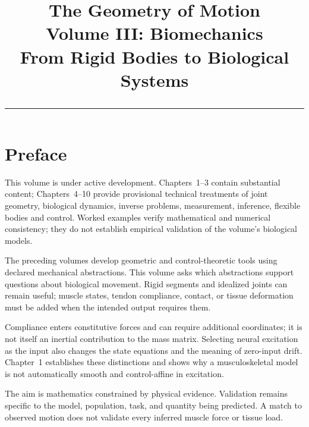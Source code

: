 \documentclass[10pt,letterpaper,openany]{book}
\title{%
  {\Huge\bfseries\color{chapblue} The Geometry of Motion}\\[0.4cm]
  {\Large Volume III: Biomechanics\\
  From Rigid Bodies to Biological Systems}\\[0.6cm]
  {\color{chapblue}\rule{\textwidth}{2pt}}
}
\date{}
\theoremstyle{plain}
\begin{document}
\maketitle
\thispagestyle{empty}
\cleardoublepage

\frontmatter
\chapter*{Preface}

\begin{gomdraftnotice}
This volume is under active development. Chapters~1--3 contain substantial
content; Chapters~4--10 provide provisional technical treatments of joint geometry,
biological dynamics, inverse problems, measurement, inference, flexible bodies
and control. Worked examples verify mathematical and numerical consistency;
they do not establish
empirical validation of the volume's biological models.
\end{gomdraftnotice}

The preceding volumes develop geometric and control-theoretic tools using
declared mechanical abstractions. This volume asks which abstractions support
questions about biological movement. Rigid segments and idealized joints can
remain useful; muscle states, tendon compliance, contact, or tissue deformation
must be added when the intended output requires them.

Compliance enters constitutive forces and can require additional coordinates;
it is not itself an inertial contribution to the mass matrix. Selecting neural
excitation as the input also changes the state equations and the meaning of
zero-input drift. Chapter~1 establishes these distinctions and shows why a
musculoskeletal model is not automatically smooth and control-affine in excitation.

The aim is mathematics constrained by physical evidence. Validation remains
specific to the model, population, task, and quantity being predicted. A match
to observed motion does not validate every inferred muscle force or tissue load.

\tableofcontents

\cleardoublepage

\mainmatter












\backmatter
\printindex



\end{document}
